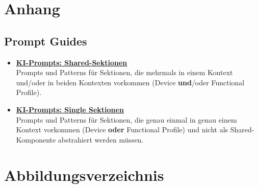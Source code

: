 \documentclass[a4paper,12pt]{article}
\begin{document}
\section{Anhang}

\subsection{Prompt Guides}
\label{sec:ai-prompts}

\begin{itemize}
    \item \label{app:prompts-shared}\textbf{\href{https://gitlab.fhnw.ch/ip5-smartgridready/docs/-/blob/main/Report/attachments/prompts-shared.md}{KI-Prompts: Shared-Sektionen}}\\
    Prompts und Patterns für Sektionen, die mehrmals in einem Kontext und/oder in beiden Kontexten vorkommen
    (Device \textbf{und}/oder Functional Profile).

    \item \label{app:prompts-single}\textbf{\href{https://gitlab.fhnw.ch/ip5-smartgridready/docs/-/blob/main/Report/attachments/prompts-single.md}{KI-Prompts: Single Sektionen}}\\
    Prompts und Patterns für Sektionen, die genau einmal in genau einem Kontext vorkommen (Device \textbf{oder} Functional Profile)
    und nicht als Shared-Komponente abstrahiert werden müssen.
\end{itemize}

\newpage
\section{Abbildungsverzeichnis}
\renewcommand{\listfigurename}{}
\listoffigures
\end{document}
